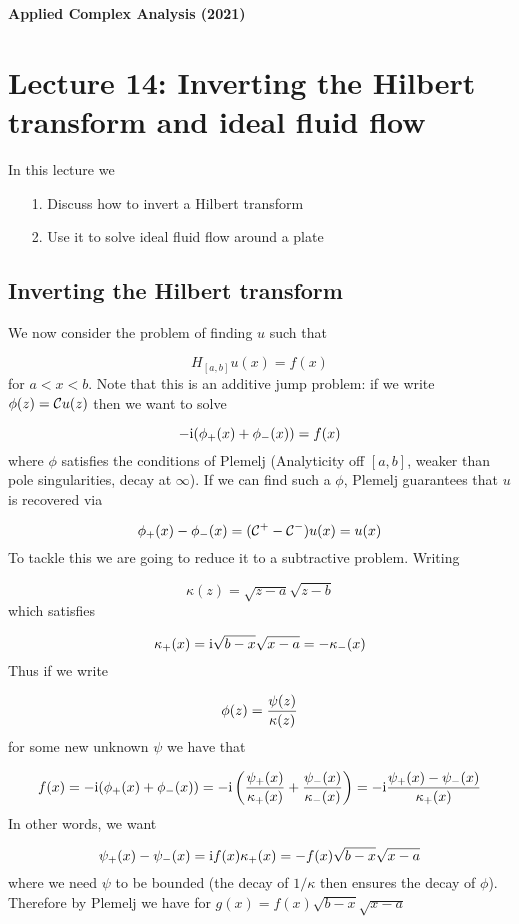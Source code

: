 \documentclass[12pt,landscape]{article}
\def\I{ {\rm i} }
\def\CC{ {\cal C} }
\begin{document}
{\LARGE
\sf
\textbf{Applied Complex Analysis (2021)}

\section{Lecture 14: Inverting the Hilbert transform and ideal fluid flow}
In this lecture we

\begin{itemize}
\item[1. ] Discuss how to invert a Hilbert transform


\item[2. ] Use it to solve ideal fluid flow around a plate

\end{itemize}
\newpage
\subsection{Inverting the Hilbert transform}
We now consider the problem of finding $u$ such that

\[
H_{[a,b]} u(x) = f(x)
\]
for $a < x < b$. Note that this is an additive jump problem: if we write $\phi(z) = \CC u(z)$ then we want to solve

\[
-\I (\phi_+(x) + \phi_-(x)) = f(x)
\]
where $\phi$ satisfies the conditions of Plemelj (Analyticity off $[a,b]$, weaker than pole singularities, decay at $\infty$). If we can find such a $\phi$, Plemelj guarantees that $u$ is recovered via

\[
\phi_+(x) - \phi_-(x) = (\CC^+ - \CC^-)u(x) = u(x)
\]
\newpage
To tackle this we are going to reduce it to a subtractive problem. Writing

\[
\kappa(z) = \sqrt{z-a} \sqrt{z-b}
\]
which satisfies

\[
\kappa_+(x) = \I \sqrt{b-x} \sqrt{x-a} = -  \kappa_-(x)
\]
Thus if we write

\[
\phi(z) = { \psi(z) \over \kappa(z) }
\]
for some new unknown $\psi$ we have that

\[
f(x) = -\I (\phi_+(x) + \phi_-(x)) = -\I \left({\psi_+(x) \over \kappa_+(x)} + {\psi_-(x) \over \kappa_-(x)}\right) =
-\I {\psi_+(x) - \psi_-(x) \over \kappa_+(x)}
\]
In other words, we want

\[
\psi_+(x) - \psi_-(x) =  \I f(x) \kappa_+(x) = -f(x)\sqrt{b-x}\sqrt{x-a}
\]
where we need $\psi$ to be bounded (the decay of $1/\kappa$ then ensures the decay of $\phi$). 
\newpage
 Therefore by Plemelj we have for $g(x) = f(x) \sqrt{b-x} \sqrt{x-a}$

}
\end{document}
